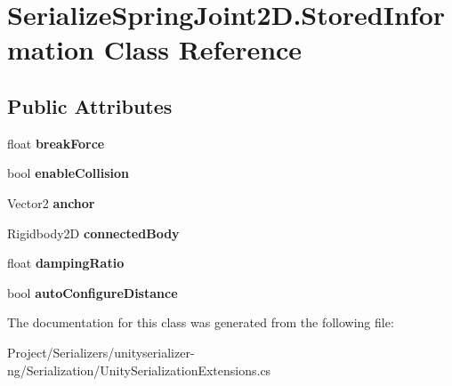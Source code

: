 \hypertarget{class_serialize_spring_joint2_d_1_1_stored_information}{}\section{Serialize\+Spring\+Joint2\+D.\+Stored\+Information Class Reference}
\label{class_serialize_spring_joint2_d_1_1_stored_information}
\subsection*{Public Attributes}
\begin{DoxyCompactItemize}
\item 
\mbox{\label{class_serialize_spring_joint2_d_1_1_stored_information_ac043a7db5424c46d8d42b690ded67baa}} 
float {\bfseries break\+Force}
\item 
\mbox{\label{class_serialize_spring_joint2_d_1_1_stored_information_af748f4709eb0c3642c2efe68f7cd79ca}} 
bool {\bfseries enable\+Collision}
\item 
\mbox{\label{class_serialize_spring_joint2_d_1_1_stored_information_a7b81e41d95a8772db30d8ffd5988a5f3}} 
Vector2 {\bfseries anchor}
\item 
\mbox{\label{class_serialize_spring_joint2_d_1_1_stored_information_a900aff47b574653ec9e2b31aea89aa7c}} 
Rigidbody2D {\bfseries connected\+Body}
\item 
\mbox{\label{class_serialize_spring_joint2_d_1_1_stored_information_a38654ace40cc8bd1cd31450620d1cb3a}} 
float {\bfseries damping\+Ratio}
\item 
\mbox{\label{class_serialize_spring_joint2_d_1_1_stored_information_a026639ccba3d53fe162523af5f9d4497}} 
bool {\bfseries auto\+Configure\+Distance}
\end{DoxyCompactItemize}


The documentation for this class was generated from the following file\+:\begin{DoxyCompactItemize}
\item 
Project/\+Serializers/unityserializer-\/ng/\+Serialization/Unity\+Serialization\+Extensions.\+cs\end{DoxyCompactItemize}
